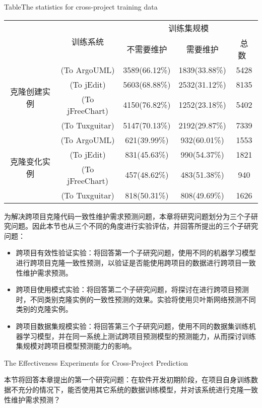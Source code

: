 \begin{table}[h]
{Table$\!$}{The statistics for cross-project training data}
\vspace{0.5em}
\centering
\wuhao
\begin{tabular}{ccccc}
\toprule[1.5pt]
~\multirow{2}{*}{类型}&\multirow{2}{*}{训练系统}&\multicolumn{3}{c}{训练集规模}\\
\cline{3-5}
~&~&{不需要维护}&{需要维护}&{总数}~\\
\midrule[1pt]
\multirow{4}{*}{克隆创建实例}
&(To ArgoUML)&3589(66.12\%)&1839(33.88\%)&5428\\
&(To jEdit)&5603(68.88\%)&2532(31.12\%)&8135\\
&(To jFreeChart)&4150(76.82\%)&1252(23.18\%)&5402\\
&(To Tuxguitar)&	5147(70.13\%)&2192(29.87\%)&	7339\\
\hline
\multirow{4}{*}{克隆变化实例}
&(To ArgoUML)&621(39.99\%)&932(60.01\%)&1553\\
&(To jEdit)&831(45.63\%)&990(54.37\%)&1821\\
&(To jFreeChart)&457(48.62\%)&483(51.38\%)&940\\
&(To Tuxguitar)&	818(50.31\%)&808(49.69\%)&1626\\
\bottomrule[1.5pt]
\end{tabular}
\end{table}

为解决跨项目克隆代码一致性维护需求预测问题，本章将研究问题划分为三个子研究问题。因此本节也从三个不同的角度进行实验评估，并回答所提出的三个子研究问题：
\begin{itemize}
\item
跨项目有效性验证实验：将回答第一个子研究问题，使用不同的机器学习模型进行跨项目克隆一致性预测，以验证是否能使用跨项目的数据进行跨项目一致性维护需求预测。
\item
跨项目使用模式实验：将回答第二个子研究问题，将探讨在进行跨项目预测时，不同类别克隆实例的一致性预测的效果。实验将使用贝叶斯网络预测不同类别的克隆实例。
\item
跨项目数据集规模实验：将回答第三个子研究问题，使用不同的数据集训练机器学习模型，并在同一系统上测试跨项目预测模型的预测能力，从而探讨训练集规模对跨项目模型预测能力的影响。
\end{itemize}

{The Effectiveness Experiments for Cross-Project Prediction}

本节将回答本章提出的第一个研究问题：在软件开发初期阶段，在项目自身训练数据不充分的情况下，能否使用其它系统的数据训练模型，并对该系统进行克隆一致性维护需求预测？

